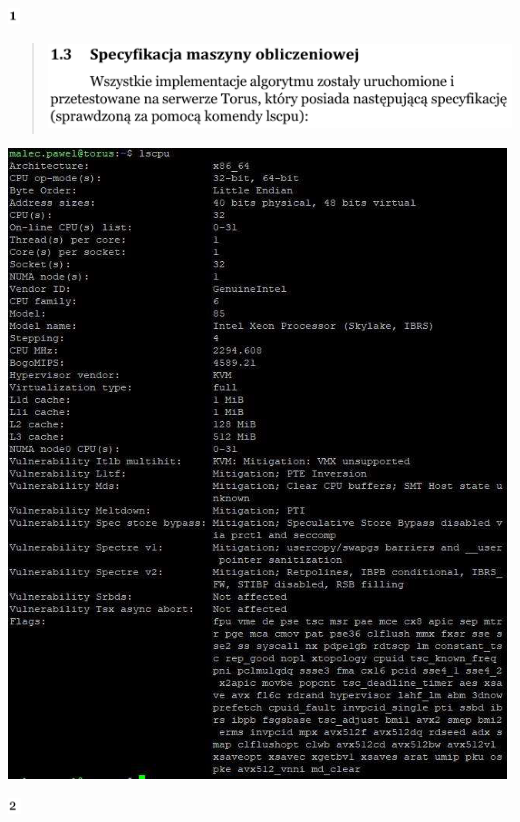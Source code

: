 \documentclass[
]{article}
\begin{document}
\includegraphics[width=0.125in,height=0.16667in]{vertopal_45f5e71363bf454ba37a280ca069ec4b/media/image10.png}

\begin{quote}
\includegraphics[width=5in,height=0.90278in]{vertopal_45f5e71363bf454ba37a280ca069ec4b/media/image11.png}
\end{quote}

\includegraphics[width=5.2in,height=6.57778in]{vertopal_45f5e71363bf454ba37a280ca069ec4b/media/image12.png}

\includegraphics[width=0.13889in,height=0.16667in]{vertopal_45f5e71363bf454ba37a280ca069ec4b/media/image13.png}
\end{document}

